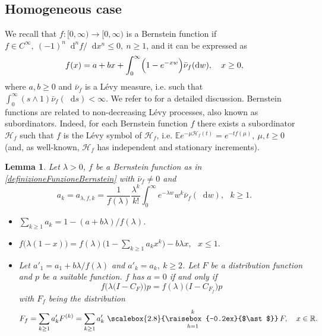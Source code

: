 \documentclass[12pt, twoside, english, headsepline]{article}
\newcommand*\dif{\mathop{}\!\mathrm{d}}  %
\newcommand{\conv}{\mathop{\scalebox{2.8}{\raisebox{-0.2ex}{$\ast$}}}} %
\newtheorem{lemma}[theorem]{Lemma}
\theoremstyle{definition} %
\numberwithin{equation}{section} %
\begin{document}
\subsection{Homogeneous case}

We recall that $f:[0,\infty)\longrightarrow [0,\infty)$ is a Bernstein function if $f\in C^\infty, \ (-1)^n \dif^n f/\dif x^n \le 0, \ n\ge1$, and it can be expressed as
\begin{equation}\label{definizioneFunzioneBernstein}
	f(x) = a+bx+ \int_0^\infty\Bigl( 1-e^{-xw}\Bigr) \bar \nu_f(\dif w), \ \ \ x\ge0,
\end{equation}
where $a,b\ge0$ and $\bar \nu_f$ is a L\'{e}vy measure, i.e. such that $\int_0^\infty (s\wedge1)\bar \nu_f(\dif s)<\infty$. We refer to \cite{SSV2012} for a detailed discussion.
Bernstein functions are related to non-decreasing L\'{e}vy processes, also known as subordinators. Indeed, for each Bernstein function $f$ there exists a subordinator $\mathcal{H}_f$ such that $f$ is the L\'{e}vy symbol of $\mathcal{H}_f$, i.e. $\mathbb{E}e^{-\mu\mathcal{H}_f(t)} = e^{-tf(\mu)}, \ \mu, t\ge0$ %
(and, as well-known, $\mathcal{H}_f$ has independent and stationary increments).


\begin{lemma}\label{lemmaEquazioneOperatorialeBernstein}
	Let $\lambda>0$, $f$ be a Bernstein function as in \eqref{definizioneFunzioneBernstein} with $ \bar \nu_f\not=0$ and
	\begin{equation}\label{pesiBernstein}
		a_k = a_{\lambda,f,k} = \frac{1}{f(\lambda)} \frac{\lambda^k}{k!}\int_0^\infty e^{-\lambda w} w^k \bar \nu_f(\dif w),\ \ \ k\ge1.
	\end{equation}
	\begin{itemize}
		\item[($i$)] $\displaystyle \sum_{k\ge1} a_k = 1-(a+b\lambda)/f(\lambda)$.
		\item[($ii$)] $ \displaystyle f\big(\lambda(1-x)\big) = f(\lambda) \Bigg(1- \sum_{k\ge 1}a_k x^k\Bigg) - b\lambda x ,\ \ \ x\le1. $
		\item[($iii$)] Let  $a'_1 = a_1 + b\lambda/f(\lambda)$ and $a'_k = a_k,\ k\ge2$. Let $F$ be a distribution function and $p$ be a suitable function. $f$ has $a=0$ if and only if
		\begin{equation}\label{relazioneOperatorialeFunzioneBernstein}
			f\Big(\lambda\big(I-C_F\big)\Big) p= f(\lambda)\big(I-C_{ F_f}\big) p
		\end{equation}
		with $F_f$ being the distribution
		\begin{equation}\label{distribuzioneComposizioneBernstein}
		F_f = \sum_{k\ge1} a'_k F^{(k)} = \sum_{k\ge1} a'_k\, \conv_{h=1}^k F, \ \ \ x\in \mathbb{R}.
		\end{equation}
	\end{itemize} 
\end{lemma}
\end{document}
